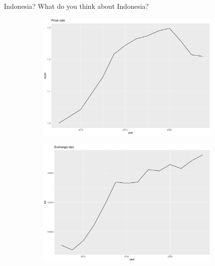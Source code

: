 \documentclass[
  ignorenonframetext,
]{beamer}
\begin{document}
\begin{frame}{Indonesia?}
\label{indonesia}
What do you think about Indonesia?

\begin{figure}

\begin{minipage}{0.50\linewidth}

\begin{figure}[H]

{\centering \includegraphics{index_files/figure-beamer/unnamed-chunk-1-1.pdf}

}


\end{figure}%

\end{minipage}%
%
\begin{minipage}{0.50\linewidth}

\begin{figure}[H]

{\centering \includegraphics{index_files/figure-beamer/unnamed-chunk-1-2.pdf}

}
\end{figure}
\end{minipage}
\end{figure}
\end{frame}
\end{document}
